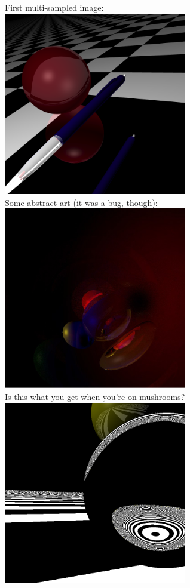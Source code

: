 \documentclass[a4paper,11pt]{article}
\begin{document}
\newpage First multi-sampled image:\\
\includegraphics[keepaspectratio,width=8.0cm]{images/multisampling_32x_side.png}\\

Some abstract art (it was a bug, though):\\
\includegraphics[keepaspectratio,width=8.0cm]{images/abstract_art}\\

\newpage Is this what you get when you're on mushrooms?\\
\includegraphics[keepaspectratio,width=8.0cm]{images/tY3lkjt}\\
\end{document}
